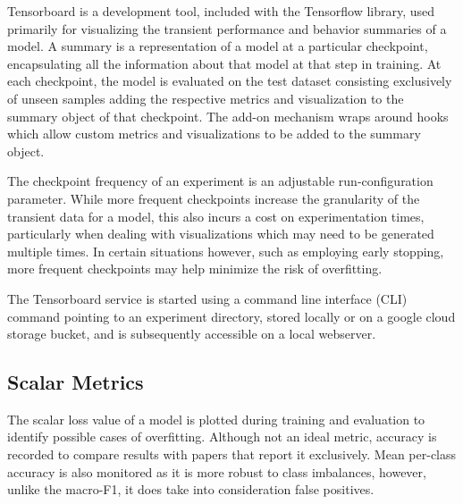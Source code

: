 \documentclass[../../fyp.tex]{subfiles}
\begin{document}
Tensorboard is a development tool, included with the Tensorflow library, used primarily for visualizing the transient performance and behavior summaries of a model. A summary is a representation of a model at a particular checkpoint, encapsulating all the information about that model at that step in training. At each checkpoint, the model is evaluated on the test dataset consisting exclusively of unseen samples adding the respective metrics and visualization to the summary object of that checkpoint. The add-on mechanism wraps around hooks which allow custom metrics and visualizations to be added to the summary object.

The checkpoint frequency of an experiment is an adjustable run-configuration parameter. While more frequent checkpoints increase the granularity of the transient data for a model, this also incurs a cost on experimentation times, particularly when dealing with visualizations which may need to be generated multiple times. In certain situations however, such as employing early stopping, more frequent checkpoints may help minimize the risk of overfitting.
 
The Tensorboard service is started using a command line interface (CLI) command pointing to an experiment directory, stored locally or on a google cloud storage bucket, and is subsequently accessible on a local webserver.   

\subsection{Scalar Metrics}
The scalar loss value of a model is plotted during training and evaluation to identify possible cases of overfitting. Although not an ideal metric, accuracy is recorded to compare results with papers that report it exclusively. Mean per-class accuracy is also monitored as it is more robust to class imbalances, however, unlike the macro-F1, it does take into consideration false positives. 
\end{document}
